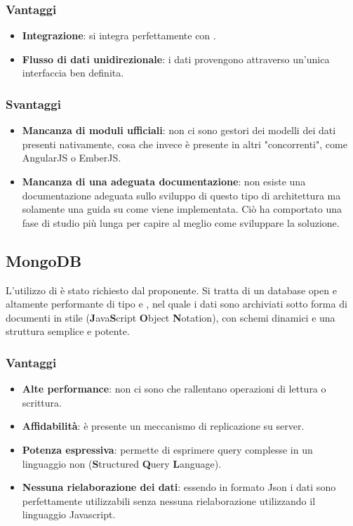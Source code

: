 \subsubsection{Vantaggi}
\begin{itemize}
\item \textbf{Integrazione}: si integra perfettamente con .
\item \textbf{Flusso di dati unidirezionale}: i dati provengono attraverso un'unica interfaccia ben definita.
\end{itemize}
\subsubsection{Svantaggi}
\begin{itemize}
\item \textbf{Mancanza di moduli ufficiali}: non ci sono gestori dei modelli dei dati presenti nativamente, cosa che invece è presente in altri  "concorrenti", come AngularJS o EmberJS.
\item \textbf{Mancanza di una adeguata documentazione}: non esiste una documentazione adeguata sullo sviluppo di questo tipo di architettura ma solamente una guida su come viene implementata. Ciò ha comportato una fase di studio più lunga per capire al meglio come sviluppare la soluzione.
\end{itemize}

\subsection{MongoDB}
L'utilizzo di  \`e stato richiesto dal proponente. Si tratta di un database  open   e altamente performante di tipo  e , nel quale i dati sono archiviati sotto forma di documenti in stile  (\textbf{J}ava\textbf{S}cript \textbf{O}bject \textbf{N}otation), con schemi dinamici e una struttura semplice e potente.
\subsubsection{Vantaggi}
\begin{itemize}
\item \textbf{Alte performance}: non ci sono  che rallentano operazioni di lettura o scrittura. 
\item \textbf{Affidabilità}: \`e presente un meccanismo di replicazione su server.
\item \textbf{Potenza espressiva}: permette di esprimere query complesse in un linguaggio non  (\textbf{S}tructured \textbf{Q}uery \textbf{L}anguage).
\item \textbf{Nessuna rielaborazione dei dati}: essendo in formato Json i dati sono perfettamente utilizzabili senza nessuna rielaborazione utilizzando il linguaggio Javascript.
\end{itemize}
